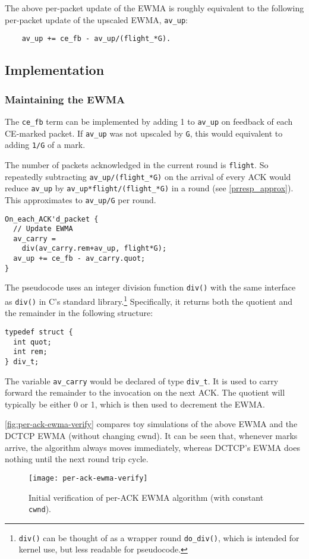 The above per-packet update of the EWMA is roughly equivalent to the following
per-packet update of the upscaled EWMA, \texttt{av\_up}:
\begin{verbatim}
    av_up += ce_fb - av_up/(flight_*G).
\end{verbatim}

\subsection{Implementation}\label{prresp_implementation}

\subsubsection{Maintaining the EWMA}

The \texttt{ce\_fb} term can be implemented by adding 1 to \texttt{av\_up} on
feedback of each CE-marked packet. If \texttt{av\_up} was not upscaled by
\texttt{G}, this would equivalent to adding \texttt{1/G} of a mark.

The number of packets acknowledged in the current round is \texttt{flight}. So
repeatedly subtracting \texttt{av\_up/(flight\_*G)} on the arrival of every ACK
would reduce \texttt{av\_up} by \texttt{av\_up*flight/(flight\_*G)} in a round
(see \autoref{prresp_approx}). This approximates to \texttt{av\_up/G} per round.

\begin{verbatim}
On_each_ACK'd_packet {
  // Update EWMA
  av_carry = 
    div(av_carry.rem+av_up, flight*G);
  av_up += ce_fb - av_carry.quot;
}
\end{verbatim}

The pseudocode uses an integer division function \texttt{div()} with the same
interface as \texttt{div()} in C's standard library.\footnote{\texttt{div()} can
be thought of as a wrapper round \texttt{do\_div()}, which is intended for
kernel use, but less readable for pseudocode.} Specifically, it returns both the
quotient and the remainder in the following structure:
\begin{verbatim}
typedef struct {
  int quot;
  int rem;
} div_t;
\end{verbatim}
The variable \texttt{av\_carry} would be declared of type \texttt{div\_t}. It is
used to carry forward the remainder to the invocation on the next ACK. The
quotient will typically be either 0 or 1, which is then used to decrement the
EWMA.

\autoref{fig:per-ack-ewma-verify} compares toy simulations of the above EWMA and
the DCTCP EWMA (without changing cwnd). It can be seen that, whenever marks
arrive, the algorithm always moves immediately, whereas DCTCP's EWMA does
nothing until the next round trip cycle.
\begin{figure}[h]
	\texttt{[image: per-ack-ewma-verify]}
	\caption{Initial verification of per-ACK EWMA algorithm (with constant \texttt{cwnd}).}\label{fig:per-ack-ewma-verify}
\end{figure}

